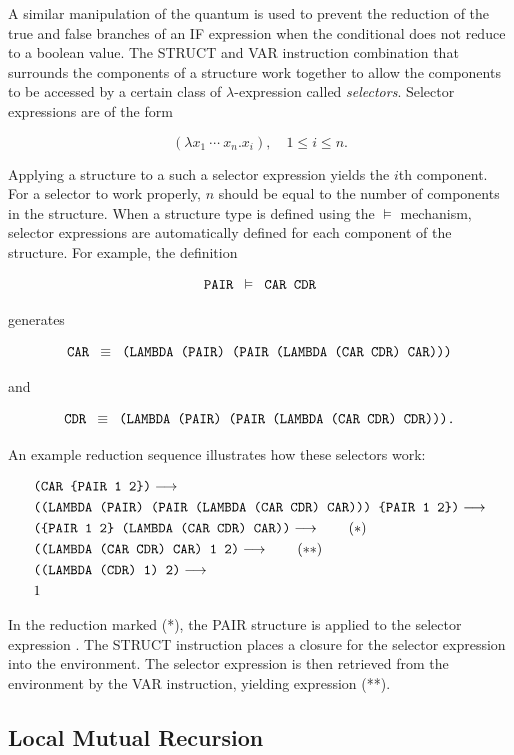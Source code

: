 A similar manipulation of the quantum is used to prevent the reduction of the true and
false branches of an IF expression when the conditional does not reduce to a boolean value.
The STRUCT and VAR instruction combination that surrounds the components of a structure
work together to allow the components to be accessed by a certain class of
\(\lambda\)-expression called \emph{selectors}. Selector expressions are of the form

\[
(\lambda x_1\ \cdots\ x_n.x_i),\quad 1 \leq i \leq n.
\]


Applying a structure to a such a selector expression yields the \(i\)th component. For a
selector to work properly, \(n\) should be equal to the number of components in the
structure. When a structure type is defined using the \(\vDash\) mechanism, selector
expressions are automatically defined for each component of the structure. For example,
the definition

\[
\texttt{PAIR }\vDash\texttt{ CAR CDR}
\]

generates

\[
\texttt{CAR }\equiv\texttt{ (LAMBDA (PAIR) (PAIR (LAMBDA (CAR CDR) CAR)))}
\]

and

\[
\texttt{CDR }\equiv\texttt{ (LAMBDA (PAIR) (PAIR (LAMBDA (CAR CDR) CDR))).}
\]

An example reduction sequence illustrates how these selectors work:

\begin{align*}
&\texttt{(CAR \{PAIR 1 2\})} \longrightarrow\\
&\texttt{((LAMBDA (PAIR) (PAIR (LAMBDA (CAR CDR) CAR))) \{PAIR 1 2\})} \longrightarrow\\
&\texttt{(\{PAIR 1 2\} (LAMBDA (CAR CDR) CAR))} \longrightarrow \qquad (*)\\
&\texttt{((LAMBDA (CAR CDR) CAR) 1 2)} \longrightarrow \qquad (**)\\
&\texttt{((LAMBDA (CDR) 1) 2)} \longrightarrow\\
&1
\end{align*}

In the reduction marked (*), the PAIR structure is applied to the selector expression
. The STRUCT instruction places a closure for the selector
expression into the environment. The selector expression is then retrieved from the
environment by the VAR instruction, yielding expression (**).

\subsection{Local Mutual Recursion}

